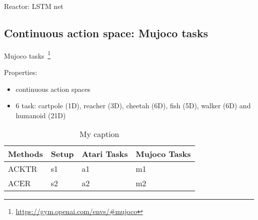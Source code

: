 Reactor: LSTM net

\subsection{Continuous action space: Mujoco tasks}
Mujoco tasks~\footnote{\url{https://gym.openai.com/envs/\#mujoco}}

Properties:
\begin{itemize}
\item continuous action spaces
\item 6 task: cartpole (1D), reacher (3D), cheetah (6D), fish (5D), walker (6D) and humanoid (21D)
\end{itemize}

\begin{table}[]
\centering
\caption{My caption}
\label{my-label}

\begin{tabular}{|l|l|l|l|}
\hline
Methods & Setup & Atari Tasks & Mujoco Tasks \\ \hline
ACKTR   & s1    & a1          & m1           \\ \hline
ACER    & s2    & a2          & m2           \\ \hline
\end{tabular}

\end{table}
